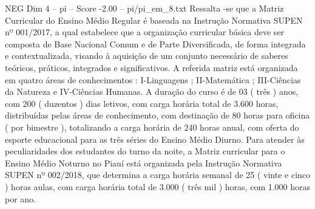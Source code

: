 \begin{textsample}{NEG Dim 4 – pi – Score -2.00 – pi/pi\_em\_8.txt}
Ressalta -se que a Matriz Curricular do Ensino Médio Regular é baseada na Instrução Normativa SUPEN nº 001/2017, a qual estabelece que a organização curricular básica deve ser composta de Base Nacional Comum e de Parte Diversificada, de forma integrada e contextualizada, visando à aquisição de um conjunto necessário de saberes teóricos, práticos, integrados e significativos.
A referida matriz está organizada em quatro áreas de conhecimentos : I-Linguagens ; II-Matemática ; III-Ciências da Natureza e IV-Ciências Humanas.
A duração do curso é de 03 ( três ) anos, com 200 ( duzentos ) dias letivos, com carga horária total de 3.600 horas, distribuídas pelas áreas de conhecimento, com destinação de 80 horas para oficina ( por bimestre ), totalizando a carga horária de 240 horas anual, com oferta do esporte educacional para as três séries do Ensino Médio Diurno.
Para atender às peculiaridades dos estudantes do turno da noite, a Matriz curricular para o Ensino Médio Noturno no Piauí está organizada pela Instrução Normativa SUPEN nº 002/2018, que determina a carga horária semanal de 25 ( vinte e cinco ) horas aulas, com carga horária total de 3.000 ( três mil ) horas, com 1.000 horas por ano.

\end{textsample}
